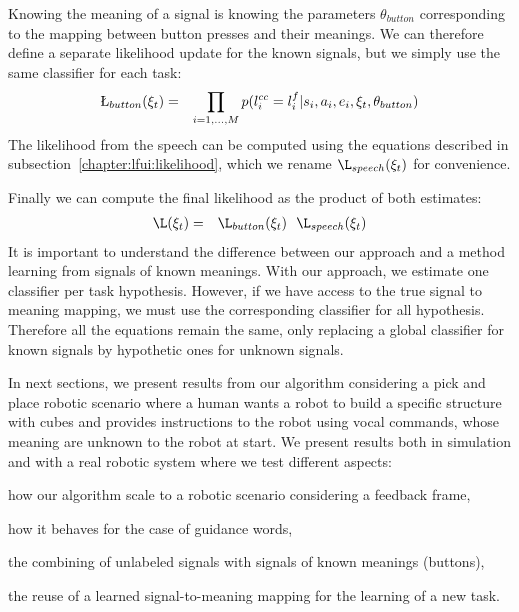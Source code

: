 Knowing the meaning of a signal is knowing the parameters $\theta_{button}$ corresponding to the mapping between button presses and their meanings. We can therefore define a separate likelihood update for the known signals, but we simply use the same classifier for each task:
%
\begin{eqnarray}
\L_{button}(\xi_t) &=& \prod_{i = 1,\ldots, M} p(l^{cc}_i = l^f_i | s_i, a_i, e_i, \xi_t, \theta_{button})
\end{eqnarray}
%
The likelihood from the speech can be computed using the equations described in subsection~\ref{chapter:lfui:likelihood}, which we rename $\L_{speech}(\xi_t)$ for convenience.

Finally we can compute the final likelihood as the product of both estimates:
%
\begin{eqnarray}
\L(\xi_t) &=& \L_{button}(\xi_t) ~~ \L_{speech}(\xi_t)
\end{eqnarray}
%
It is important to understand the difference between our approach and a method learning from signals of known meanings. With our approach, we estimate one classifier per task hypothesis. However, if we have access to the true signal to meaning mapping, we must use the corresponding classifier for all hypothesis. Therefore all the equations remain the same, only replacing a global classifier for known signals by hypothetic ones for unknown signals.

\transition

In next sections, we present results from our algorithm considering a pick and place robotic scenario where a human wants a robot to build a specific structure with cubes and provides instructions to the robot using vocal commands, whose meaning are unknown to the robot at start. We present results both in simulation and with a real robotic system where we test different aspects: \begin{inparaenum}[(a)] \item how our algorithm scale to a robotic scenario considering a feedback frame, \item how it behaves for the case of guidance words, \item the combining of unlabeled signals with signals of known meanings (buttons), \item the reuse of a learned signal-to-meaning mapping for the learning of a new task. \end{inparaenum}

